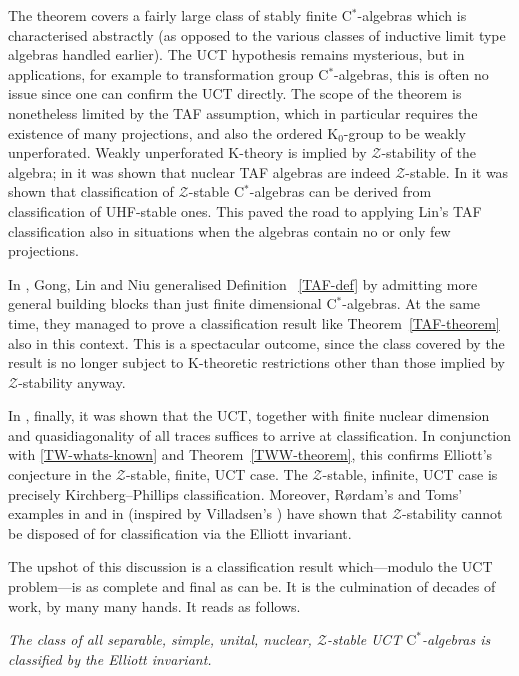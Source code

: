 \documentclass{amsart}
\newcounter{number}[section]
\newenvironment{nummer}{\refstepcounter{number}{\noindent\arabic{section}.\arabic{number}}}{}
\newcommand{\bn}{\noindent \begin{nummer} \rm}
\newcommand{\en}{\end{nummer}}
\newenvironment{ntheorem}{\noindent {\sc Theorem:} \it}{}
\begin{document}
\bn
The theorem covers a fairly large class of stably finite C$^*$-algebras which is characterised abstractly (as opposed to the various classes of inductive limit type algebras handled earlier). The UCT hypothesis remains mysterious, but in applications, for example to transformation group C$^*$-algebras, this is often no issue since one can confirm the UCT directly. The scope of the theorem is nonetheless limited by the TAF assumption, which in particular requires the existence of many projections, and also the ordered $\mathrm{K}_0$-group to be weakly unperforated. Weakly unperforated $\mathrm{K}$-theory is implied by $\mathcal{Z}$-stability of the algebra; in \cite{MS:DMJ} it was shown that nuclear TAF algebras are indeed $\mathcal{Z}$-stable. In \cite{Win:localizing} it was shown that classification of $\mathcal{Z}$-stable C$^*$-algebras can be derived from classification of UHF-stable ones. This paved the road to applying Lin's TAF classification also in situations when the algebras contain no or only few projections. 

In \cite{GLN:arXiv}, Gong, Lin and Niu generalised Definition ~\ref{TAF-def} by admitting more general building blocks  than just finite dimensional C$^*$-algebras. At the same time, they managed to prove a classification result like Theorem~\ref{TAF-theorem} also in this context. This is a spectacular outcome, since the class covered by the result is no longer subject to $\mathrm{K}$-theoretic restrictions other than those implied by $\mathcal{Z}$-stability anyway. 

In \cite{EGLN:arXiv}, finally, it was shown that the UCT, together with finite nuclear dimension and quasidiagonality of all traces suffices to arrive at classification. 
In conjunction with \ref{TW-whats-known} and Theorem~\ref{TWW-theorem}, this confirms Elliott's conjecture in the $\mathcal{Z}$-stable, finite, UCT case. The $\mathcal{Z}$-stable, infinite, UCT case is precisely Kirchberg--Phillips classification. Moreover, R{\o}rdam's and Toms' examples in \cite{R:Acta} and in \cite{T:Ann} (inspired by Villadsen's \cite{V:JAMS}) have shown that $\mathcal{Z}$-stability cannot be disposed of for classification via the Elliott invariant. 

The upshot of this discussion is a classification result which---modulo the UCT problem---is as complete and final as can be. It is the culmination of decades of work, by many many hands. It reads as follows.

\begin{ntheorem}
The class of all separable, simple, unital, nuclear, $\mathcal{Z}$-stable UCT $\mathrm{C}^*$-algebras is classified by the Elliott invariant.
\end{ntheorem} 
\en




\nocite{EllToms:BAMS}
\nocite{Bro:symbiosis}
\nocite{Popa:JOT}
\nocite{Cun:CMP}
\nocite{EE:Ann}
\nocite{EGL:Invent}
\nocite{H:JFA}
\nocite{Haa:quasitraces}
\nocite{HigKas:Invent}



\end{document}
